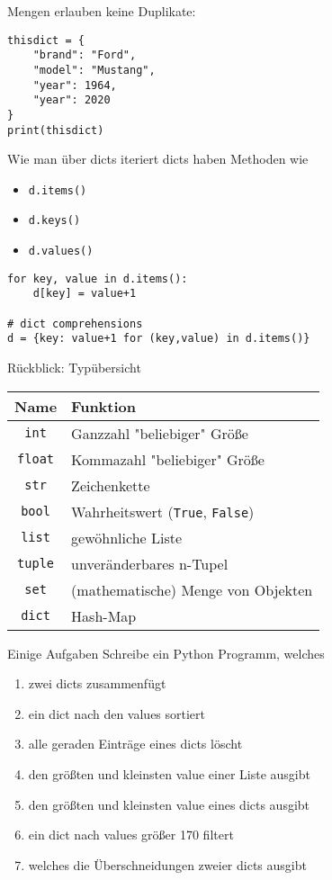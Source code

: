 \begin{frame}[fragile]
Mengen erlauben keine Duplikate:
\begin{lstlisting}
thisdict = {
    "brand": "Ford",
    "model": "Mustang",
    "year": 1964,
    "year": 2020
}
print(thisdict) 

\end{lstlisting}	
\end{frame}

\begin{frame}[fragile]{Wie man über dicts iteriert}
dicts haben Methoden wie
\begin{itemize}
	\item \texttt{d.items()}
	\item \texttt{d.keys()}
	\item \texttt{d.values()}
\end{itemize}
\begin{lstlisting}
for key, value in d.items():
	d[key] = value+1
	
# dict comprehensions
d = {key: value+1 for (key,value) in d.items()}
\end{lstlisting}
\end{frame}

\begin{frame}{Rückblick: Typübersicht}
	\begin{tabular}{c|l}
		Name & Funktion \\ \hline
		\texttt{int} & Ganzzahl "beliebiger" Größe \\
		\texttt{float} & Kommazahl "beliebiger" Größe \\
		\texttt{str} & Zeichenkette \\
		\texttt{bool} & Wahrheitswert (\texttt{True}, \texttt{False})\\ \hline
		\texttt{list} & gewöhnliche Liste \\
		\texttt{tuple} & unveränderbares n-Tupel \\
		\texttt{set} & (mathematische) Menge von Objekten \\
		\texttt{dict} & Hash-Map \\
	\end{tabular}
\end{frame}

\begin{frame}{Einige Aufgaben}
Schreibe ein Python Programm, welches
	\begin{enumerate}
		\item zwei dicts zusammenfügt
		\item ein dict nach den values sortiert
		\item alle geraden Einträge eines dicts löscht
		\item den größten und kleinsten value einer Liste ausgibt
		\item den größten und kleinsten value eines dicts ausgibt
		\item ein dict nach values größer 170 filtert
		\item welches die Überschneidungen zweier dicts ausgibt
	\end{enumerate}
\end{frame}


